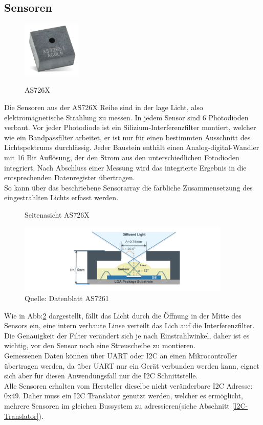 \newpage
\subsection{Sensoren}\label{Sensoren}

\begin{figure}
\centering
\caption{AS726X}
\includegraphics[width=0.25\textwidth]{img/as726X.png}
\label{fig:AS726X}
\end{figure}

Die Sensoren aus der AS726X Reihe sind in der lage Licht, also elektromagnetische Strahlung zu messen. 
In jedem Sensor sind 6 Photodioden verbaut. 
Vor jeder Photodiode ist ein Silizium-Interferenzfilter montiert, welcher wie ein Bandpassfilter arbeitet, er ist nur für einen bestimmten Ausschnitt des Lichtspektrums durchlässig.
Jeder Baustein enthält einen Analog-digital-Wandler mit 16 Bit Auflösung, der den Strom aus den unterschiedlichen Fotodioden integriert. Nach Abschluss einer Messung wird das integrierte Ergebnis in die entsprechenden Datenregister übertragen.\\
So kann über das beschriebene Sensorarray die farbliche Zusammensetzung des eingestrahlten Lichts erfasst werden.

\begin{figure}[H]
\centering
\caption{Seitenasicht AS726X}
\includegraphics[width=0.9\textwidth]{img/AS726X-seitenansicht.png}
\caption*{Quelle: Datenblatt AS7261}
\label{fig:Seitenasicht-AS726X}
\end{figure}

\noindent Wie in Abb:\ref{fig:Seitenasicht-AS726X} dargestellt, fällt das Licht durch die Öffnung in der Mitte des Sensors ein, eine intern verbaute Linse verteilt das Lich auf die Interferenzfilter. Die Genauigkeit der Filter verändert sich je nach Einstrahlwinkel, daher ist es wichtig, vor den Sensor noch eine Streuscheibe zu montieren.\\
Gemessenen Daten können über UART oder I2C an einen Mikrocontroller übertragen werden, da über UART nur ein Gerät verbunden werden kann, eignet sich aber für diesen Anwendungsfall nur die I2C Schnittstelle.\\
Alle Sensoren erhalten vom Hersteller dieselbe nicht veränderbare I2C Adresse: 0x49. Daher muss ein I2C Translator genutzt werden, welcher es ermöglicht, mehrere Sensoren im gleichen Bussystem zu adressieren(siehe Abschnitt \ref{I2C-Translator}).\\

